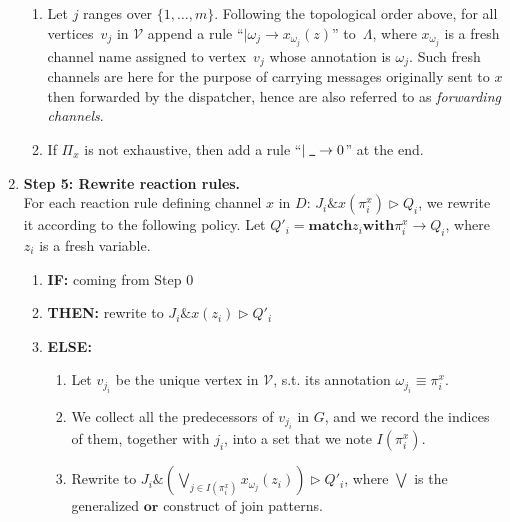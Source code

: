 \documentclass{LMCS}
\newcommand{\pt}{\pi}
\newcommand{\ptbis}{\omega}
\newcommand{\pts}{\Pi}
\newcommand{\kwd}[1]{\ensuremath{\mathbf{#1}}}
\newcommand{\prefix}[1]{\mathopen{}\mathrel{\kwd {#1}}}
\newcommand{\infix}[1]{\mathrel{\kwd {#1}}}
\newcommand{\set}[1]{\{#1\}}
\renewcommand{\_}{\mathord{\rule[-.25ex]{1ex}{.15ex}}}
\newcommand{\V}{\mathcal{V}}
\newcommand{\nullp}{0}
\newcommand{\para}[2]{#1\mathop{\&}#2}
\newcommand{\matchone}[3]{\prefix{match} #1 \infix{with} #2
  \rightarrow #3}
\newcommand{\reaction}[2]{#1 \triangleright #2}
\newcommand{\preds}[1]{I(#1)}
\begin{document}
\begin{enumerate}[\ ]
\begin{enumerate}[(1)]
  \item Let $j$ ranges over $\set{1, \ldots, m}$. Following the
    topological order above, for all vertices~$v_j$ in $\V$ append a
    rule ``$\mid \ptbis_j \rightarrow x_{\ptbis_j}(z)$'' to~$\Lambda$,
    where $x_{\ptbis_j}$ is a fresh channel name assigned to
    vertex~$v_j$ whose annotation is $\ptbis_j$. Such fresh channels are here
    for the purpose of carrying messages originally sent to $x$ then
    forwarded by the dispatcher, hence are also referred to as
    \emph{forwarding channels}.
  \item If $\pts_x$ is not exhaustive, then add a rule ``$\mid \_
    \rightarrow \nullp$'' at the end.
  \end{enumerate}
\item {\bf Step 5: Rewrite reaction rules.} \hspace*{1cm} \\
  For each reaction rule defining channel $x$ in $D$:
  $\reaction{\para{J_i}{x(\pt^x_i)}}{Q_i}$, we rewrite it according to
  the following policy. Let $Q'_i = \matchone{z_i}{\pt^x_i}{Q_i}$, where
  $z_i$ is a fresh variable.
  \begin{enumerate}[\ ]
  \item {\bf IF:} coming from Step 0
  \item {\bf THEN:} rewrite to
    $\reaction{\para{J_i}{x(z_i)}}{Q'_i}$
  \item {\bf ELSE:}\hspace*{1cm}
    \begin{enumerate}[(1)]
    \item Let $v_{j_{i}}$ be the unique vertex in $\V$, s.t.  its
      annotation ${\ptbis_{j_{i}}} \equiv \pt^x_i$.
    \item We collect all the predecessors of $v_{j_{i}}$ in $G$, and
      we record the indices of them, together with $j_i$, into a set
      that we note $\preds{\pt^x_i}$.
    \item Rewrite to $\reaction{\para{J_i}
        {({\displaystyle\bigvee}_{j\in\preds{\pt^x_i}}x_{\ptbis_j}(z_i))}} {Q'_i}$,
      where $\displaystyle\bigvee$ is the generalized $\kwd{or}$ construct of
      join patterns.
    \end{enumerate}
    \end{enumerate}
    \end{enumerate}
\end{document}
